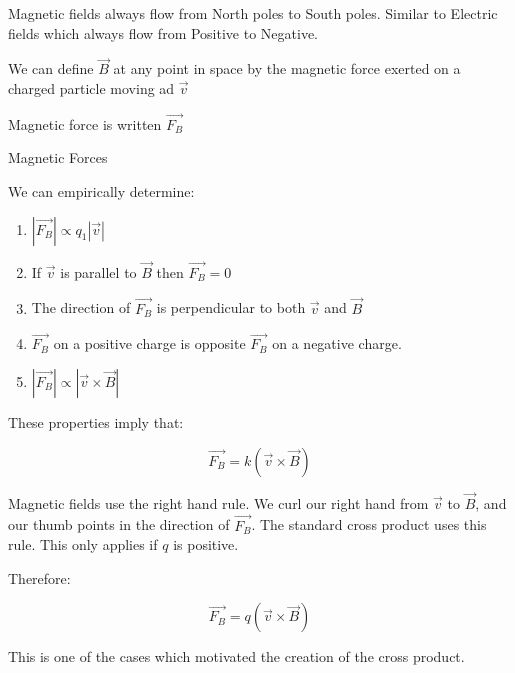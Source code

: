 \documentclass{report}
\begin{document}
\begin{description}
\begin{mdframed}
            Magnetic fields always flow from North
            poles to South poles. Similar to Electric
            fields which always flow from Positive
            to Negative.

            We can define $\vec{B}$ at any point in space
            by the magnetic force exerted on a charged
            particle moving ad $\vec{v}$

            Magnetic force is written $\vec{F_B}$
        \end{mdframed}
        \pagebreak
    \item {\large Magnetic Forces}
        \begin{mdframed}
           We can empirically determine: 
           \begin{enumerate}
               \item $|\vec{F_B}| \propto q_1 |\vec{v}|$
               \item If $\vec{v}$ is parallel to  $\vec{B}$
                   then  $\vec{F_B} = 0$
               \item The direction of $\vec{F_B}$ is
                   perpendicular to both  $\vec{v}$
                   and  $\vec{B}$
               \item $\vec{F_B}$ on a positive charge is opposite
                   $\vec{F_B}$ on a negative charge.
               \item $|\vec{F_B}| \propto |\vec{v} \times \vec{B}|$
           \end{enumerate}

           These properties imply that:

           \begin{displaymath}
                \vec{F_B} = k(\vec{v} \times \vec{B})
           \end{displaymath}
           
           Magnetic fields use the right hand rule. We curl
           our right hand from $\vec{v}$ to  $\vec{B}$, and
           our thumb points in the direction of $\vec{F_B}$.
           The standard cross product uses this rule. This
           only applies if $q$ is positive. 

           Therefore:

           \begin{displaymath}
                \vec{F_B} = q(\vec{v} \times \vec{B})
           \end{displaymath}

           This is one of the cases which motivated the
           creation of the cross product.


\end{mdframed}
\end{description}
\end{document}
